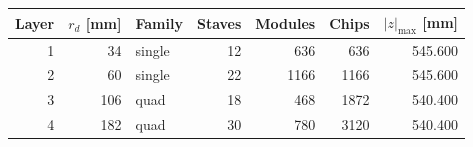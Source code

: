 \begin{tabular}{r r l r r r r}
\toprule
Layer & $r_d$ [mm] & Family & Staves & Modules & Chips & $|z|_{\max}$ [mm]\\
\midrule
1 & 34 & single & 12 & 636 & 636 & \num{545.600} \\
2 & 60 & single & 22 & 1166 & 1166 & \num{545.600} \\
3 & 106 & quad & 18 & 468 & 1872 & \num{540.400} \\
4 & 182 & quad & 30 & 780 & 3120 & \num{540.400} \\
\bottomrule
\end{tabular}
